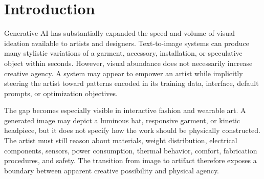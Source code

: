 \documentclass{article}
\begin{document}
\begin{abstract}
Generative AI can rapidly produce fashion images and visual variations, but image generation alone does not help artists determine how an interactive garment or wearable artwork can be physically built, tested, and revised. We present a proposed artifact-grounded co-creative system that translates multimodal artistic intent into a joint representation of aesthetic goals, electronic components, materials, spatial relationships, fabrication constraints, and physical uncertainty. The system retrieves relevant creative and technical references, generates multiple interpretable design alternatives, supports human selection and refusal, and incorporates evidence from a fabricated artifact into subsequent design iterations. We frame creative agency not as a fixed property of either the artist or the model, but as something negotiated across artist decisions, model suggestions, retrieved precedents, technical constraints, sensors, and physical materials. The initial study centers on an interactive sound-responsive fashion artifact and compares a base Gemma model, retrieval-grounded Gemma, and an adapted Gemma model with structured creative-reference retrieval. We propose mixed-method evaluation of artistic-intent alignment, design diversity, physical feasibility, explanation quality, artist-perceived agency, manual correction effort, and post-fabrication improvement. The contribution is a framework for creative AI that moves beyond visual ideation toward embodied, accountable, and revisable human--AI co-creation.
\end{abstract}

\section{Introduction}

Generative AI has substantially expanded the speed and volume of visual
ideation available to artists and designers. Text-to-image systems can produce
many stylistic variations of a garment, accessory, installation, or speculative
object within seconds. However, visual abundance does not necessarily increase
creative agency. A system may appear to empower an artist while implicitly
steering the artist toward patterns encoded in its training data, interface,
default prompts, or optimization objectives.

The gap becomes especially visible in interactive fashion and wearable art.
A generated image may depict a luminous hat, responsive garment, or kinetic
headpiece, but it does not specify how the work should be physically
constructed. The artist must still reason about materials, weight distribution,
electrical components, sensors, power consumption, thermal behavior, comfort,
fabrication procedures, and safety. The transition from image to artifact
therefore exposes a boundary between apparent creative possibility and
physical agency.
\end{document}

